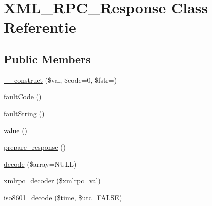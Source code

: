 \hypertarget{class_x_m_l___r_p_c___response}{}\section{X\+M\+L\+\_\+\+R\+P\+C\+\_\+\+Response Class Referentie}
\label{class_x_m_l___r_p_c___response}
\subsection*{Public Members}
\begin{DoxyCompactItemize}
\item 
\mbox{\hyperlink{class_x_m_l___r_p_c___response_a62cc1aaff0155564cfc1c280707a8f86}{\+\_\+\+\_\+construct}} (\$val, \$code=0, \$fstr=\textquotesingle{}\textquotesingle{})
\item 
\mbox{\hyperlink{class_x_m_l___r_p_c___response_ad6849a82f23db4d67e06a7fcaa94aec2}{fault\+Code}} ()
\item 
\mbox{\hyperlink{class_x_m_l___r_p_c___response_a2f922009ed0801616d3df198a48d193b}{fault\+String}} ()
\item 
\mbox{\hyperlink{class_x_m_l___r_p_c___response_aefbfa229f1c9e1fc967bff724a010f9e}{value}} ()
\item 
\mbox{\hyperlink{class_x_m_l___r_p_c___response_ac6925a06291928e6d4e8e53ea10fb1e2}{prepare\+\_\+response}} ()
\item 
\mbox{\hyperlink{class_x_m_l___r_p_c___response_a03c0253c215ae6aaafc6a949276b06bd}{decode}} (\$array=N\+U\+LL)
\item 
\mbox{\hyperlink{class_x_m_l___r_p_c___response_a44f453c58a4aad3ccb76dd9926f9fa64}{xmlrpc\+\_\+decoder}} (\$xmlrpc\+\_\+val)
\item 
\mbox{\hyperlink{class_x_m_l___r_p_c___response_afd1f70f703eb82303e1199e8653c9c44}{iso8601\+\_\+decode}} (\$time, \$utc=F\+A\+L\+SE)
\end{DoxyCompactItemize}
